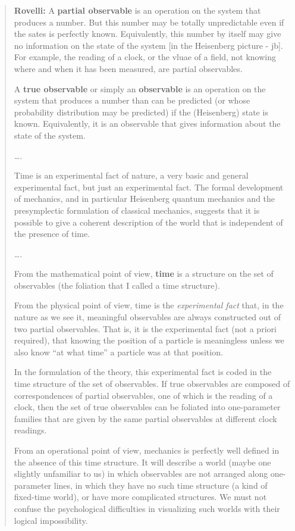 \documentclass{article}
\begin{document}
\begin{quote}
\textbf{Rovelli:} A \textbf{partial observable} is an operation on the
system that produces a number. But this number may be totally
unpredictable even if the sates is perfectly known. Equivalently, this
number by itself may give no information on the state of the system
{[}in the Heisenberg picture - jb{]}. For example, the reading of a
clock, or the vluae of a field, not knowing where and when it has been
measured, are partial observables.

A \textbf{true observable} or simply an \textbf{observable} is an
operation on the system that produces a number than can be predicted (or
whose probability distribution may be predicted) if the (Heisenberg)
state is known. Equivalently, it is an observable that gives information
about the state of the system.

\ldots.

Time is an experimental fact of nature, a very basic and general
experimental fact, but just an experimental fact. The formal development
of mechanics, and in particular Heisenberg quantum mechanics and the
presymplectic formulation of classical mechanics, suggests that it is
possible to give a coherent description of the world that is independent
of the presence of time.

\ldots.

From the mathematical point of view, \textbf{time} is a structure on the
set of observables (the foliation that I called a time structure).

From the physical point of view, time is the \emph{experimental fact}
that, in the nature as we see it, meaningful observables are always
constructed out of two partial observables. That is, it is the
experimental fact (not a priori required), that knowing the position of
a particle is meaningless unless we also know ``at what time'' a
particle was at that position.

In the formulation of the theory, this experimental fact is coded in the
time structure of the set of observables. If true observables are
composed of correspondences of partial observables, one of which is the
reading of a clock, then the set of true observables can be foliated
into one-parameter families that are given by the same partial
observables at different clock readings.

From an operational point of view, mechanics is perfectly well defined
in the absence of this time structure. It will describe a world (maybe
one slightly unfamiliar to us) in which observables are not arranged
along one-parameter lines, in which they have no such time structure (a
kind of fixed-time world), or have more complicated structures. We must
not confuse the psychological difficulties in visualizing such worlds
with their logical impossibility.


\end{quote}
\end{document}
